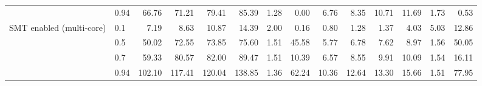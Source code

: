 \begin{table}
{\begin{tabular}{llrrrrrrrrrrrr}
 & 0.94 & 66.76 & 71.21 & 79.41 & 85.39 & 1.28 & 0.00 & 6.76 & 8.35 & 10.71 & 11.69 & 1.73 & 0.53 \\
\cmidrule{1-14}
\multirow[t]{4}{*}{SMT enabled (multi-core)} & 0.1 & 7.19 & 8.63 & 10.87 & 14.39 & 2.00 & 0.16 & 0.80 & 1.28 & 1.37 & 4.03 & 5.03 & 12.86 \\
 & 0.5 & 50.02 & 72.55 & 73.85 & 75.60 & 1.51 & 45.58 & 5.77 & 6.78 & 7.62 & 8.97 & 1.56 & 50.05 \\
 & 0.7 & 59.33 & 80.57 & 82.00 & 89.47 & 1.51 & 10.39 & 6.57 & 8.55 & 9.91 & 10.09 & 1.54 & 16.11 \\
 & 0.94 & 102.10 & 117.41 & 120.04 & 138.85 & 1.36 & 62.24 & 10.36 & 12.64 & 13.30 & 15.66 & 1.51 & 77.95 \\
\cmidrule{1-14}
\bottomrule
\end{tabular}%
}
\end{table}
